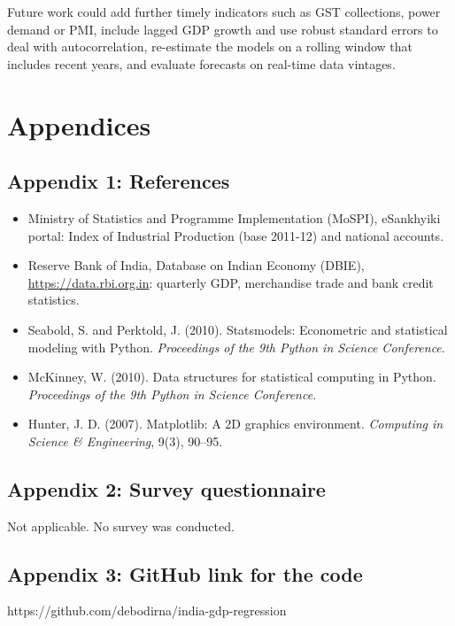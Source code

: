 \documentclass[11pt, a4paper]{article}
\begin{document}
Future work could add further timely indicators such as GST collections, power demand or PMI, include lagged GDP growth and use robust standard errors to deal with autocorrelation, re-estimate the models on a rolling window that includes recent years, and evaluate forecasts on real-time data vintages.

\section{Appendices}

\subsection*{Appendix 1: References}
\begin{itemize}
    \item Ministry of Statistics and Programme Implementation (MoSPI), eSankhyiki portal: Index of Industrial Production (base 2011-12) and national accounts.
    \item Reserve Bank of India, Database on Indian Economy (DBIE), \url{https://data.rbi.org.in}: quarterly GDP, merchandise trade and bank credit statistics.
    \item Seabold, S. and Perktold, J. (2010). Statsmodels: Econometric and statistical modeling with Python. \textit{Proceedings of the 9th Python in Science Conference}.
    \item McKinney, W. (2010). Data structures for statistical computing in Python. \textit{Proceedings of the 9th Python in Science Conference}.
    \item Hunter, J. D. (2007). Matplotlib: A 2D graphics environment. \textit{Computing in Science \& Engineering}, 9(3), 90--95.
\end{itemize}

\subsection*{Appendix 2: Survey questionnaire}
Not applicable. No survey was conducted.

\subsection*{Appendix 3: GitHub link for the code}
https://github.com/debodirna/india-gdp-regression
\end{document}
